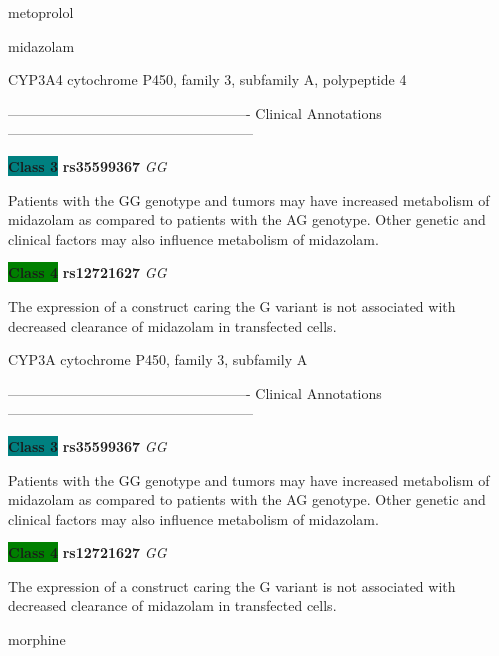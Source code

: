 \documentclass{resume} %
\begin{document}
\begin{rSection}{ metoprolol }
\end{rSection}\begin{rSection}{ midazolam }
\item[]

\begin{rSubsection}{ CYP3A4 }{ cytochrome P450, family 3, subfamily A, polypeptide 4 }{}{}
\item[]

\item[] ---------------------------------------------------- Clinical Annotations -----------------------------------------------------\newline
\item \textbf{\colorbox{teal} {Class 3}} \textbf{ rs35599367 } \textit{ GG }
\item[] Patients with the GG genotype and tumors may have increased metabolism of midazolam as compared to patients with the AG genotype. Other genetic and clinical factors may also influence metabolism of midazolam. \item \textbf{\colorbox{green} {Class 4}} \textbf{ rs12721627 } \textit{ GG }
\item[] The expression of a construct caring the G variant is not associated with decreased clearance of midazolam in transfected cells.
\end{rSubsection}\begin{rSubsection}{ CYP3A }{ cytochrome P450, family 3, subfamily A }{}{}
\item[]

\item[] ---------------------------------------------------- Clinical Annotations -----------------------------------------------------\newline
\item \textbf{\colorbox{teal} {Class 3}} \textbf{ rs35599367 } \textit{ GG }
\item[] Patients with the GG genotype and tumors may have increased metabolism of midazolam as compared to patients with the AG genotype. Other genetic and clinical factors may also influence metabolism of midazolam. \item \textbf{\colorbox{green} {Class 4}} \textbf{ rs12721627 } \textit{ GG }
\item[] The expression of a construct caring the G variant is not associated with decreased clearance of midazolam in transfected cells.
\end{rSubsection}

\end{rSection}\begin{rSection}{ morphine }
\item[]


\end{rSection}
\end{document}
